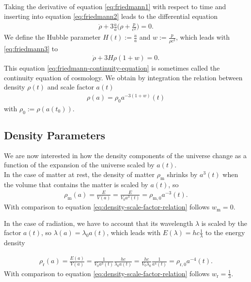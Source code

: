 \noindent Taking the derivative of equation \eqref{eq:friedmann1} with respect to time and inserting into equation \eqref{eq:friedmann2} leads to the differential equation 
\begin{align}
    \dot{\rho} + 3\frac{\dot{a}}{a} \biggl( \rho + \frac{p}{c^2} \biggr) = 0. \label{eq:friedmann3}
\end{align}
We define the Hubble parameter $\displaystyle H(t):= \frac{\dot{a}}{a}$ and $\displaystyle w := \frac{p}{\rho c^2}$, which leads with \eqref{eq:friedmann3} to 
\begin{align}
    \dot{\rho} + 3H\rho(1+w) = 0. \label{eq:friedmann-continuity-equation}  
\end{align}
This equation \eqref{eq:friedmann-continuity-equation} is sometimes called the continuity equation of cosmology. We obtain by integration the relation between density $\rho(t)$ and scale factor $a(t)$ 
\begin{align}
    \rho(a) = \rho_{0} a^{-3(1 + w)}(t) \label{eq:density-scale-factor-relation} 
\end{align}
with $\rho_{0} := \rho(a(t_{0}))$.


\subsection{Density Parameters}

\noindent We are now interested in how the density components of the universe change as a function of the expansion of the universe scaled by $a(t)$. \\

\noindent In the case of matter at rest, the density of matter $\rho_{\text{m}}$ shrinks by $a^{3}(t)$ when the volume that contains the matter is scaled by $a(t)$, so 
\begin{align}
    \rho_{\text{m}}(a) = \frac{E}{V(a)} = \frac{E}{V_{0} a^{3}(t)} = \rho_{\text{m}, 0} a^{-3}(t). \label{eq:matter-density-scale} 
\end{align}
With comparison to equation \eqref{eq:density-scale-factor-relation} follows $w_{\text{m}} = 0$.

\noindent In the case of radiation, we have to account that its wavelength $\lambda$ is scaled by the factor $a(t)$, so $\lambda(a) = \lambda_{0} a(t)$, which leads with $E(\lambda) = h c \frac{1}{\lambda}$ to the energy density

\begin{align}
    \rho_{\text{r}}(a) = \frac{E(a)}{V(a)} = \frac{1}{V_{0} a^3(t)} \frac{h c}{\lambda_{0} a(t)} = \frac{h c}{V_{0} \lambda_{0}} \frac{1}{a^{4}(t)} = \rho_{\text{r},0} a^{-4}(t). \label{eq:radiation-density-scale}
\end{align}
With comparison to equation \eqref{eq:density-scale-factor-relation} follows $w_{\text{r}} = \frac{1}{3}$.

